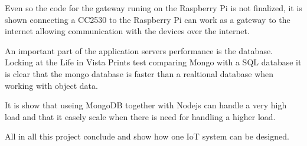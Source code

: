 \documentclass[a4paper,12pt,english]{article}
\begin{document}
Even so the code for the gateway runing on the Raspberry Pi is not finalized, it
is shown connecting a CC2530 to the Raspberry Pi can work as a gateway to
the internet allowing communication with the devices over the internet.

An important part of the application servers performance is the database.
Locking at the Life in Vista Prints test comparing Mongo with a SQL database it
is clear that the mongo database is faster than a realtional database when
working with object data.

It is show that useing MongoDB together with Nodejs can handle a very high
load and that it easely scale when there is need for handling a higher load.

All in all this project conclude and show how one IoT system can be designed. 
\clearpage
\end{document}
